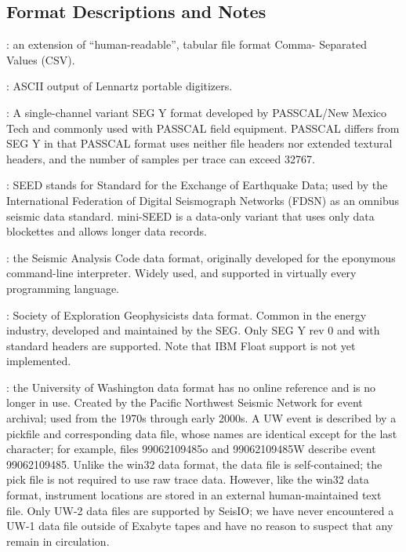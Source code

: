 \documentclass[letterpaper,11pt,english]{sphinxmanual}
\begin{document}
\subsection{Format Descriptions and Notes}
\label{\detokenize{src/Formats/fileformats:format-descriptions-and-notes}}
: an extension of “human-readable”, tabular file format Comma-
Separated Values (CSV).

: ASCII output of Lennartz portable digitizers.

: A single-channel variant SEG Y format developed by PASSCAL/New
Mexico Tech and commonly used with PASSCAL field equipment. PASSCAL differs from
SEG Y in that PASSCAL format uses neither file headers nor extended textural
headers, and the number of samples per trace can exceed 32767.

: SEED stands for
Standard for the Exchange of Earthquake Data; used by the International
Federation of Digital Seismograph Networks (FDSN) as an omnibus seismic data
standard. mini-SEED is a data-only variant that uses only data blockettes
and allows longer data records.

: the
Seismic Analysis Code data format, originally developed for the eponymous
command-line interpreter. Widely used, and supported in virtually every
programming language.

: Society of Exploration Geophysicists
data format. Common in the energy industry, developed and maintained by the SEG.
Only SEG Y rev 0 and 
with standard headers are supported. Note that IBM Float support is not yet
implemented.

: the University of Washington data format has no online reference and is
no longer in use. Created by the Pacific Northwest Seismic Network for event
archival; used from the 1970s through early 2000s. A UW event is described by a
pickfile and corresponding data file, whose names are identical except for the
last character; for example, files 99062109485o and 99062109485W describe event
99062109485. Unlike the win32 data format, the data file is self-contained; the
pick file is not required to use raw trace data. However, like the win32 data
format, instrument locations are stored in an external human-maintained text
file. Only UW-2 data files are supported by SeisIO; we have never encountered a
UW-1 data file outside of Exabyte tapes and have no reason to suspect that any
remain in circulation.
\end{document}
